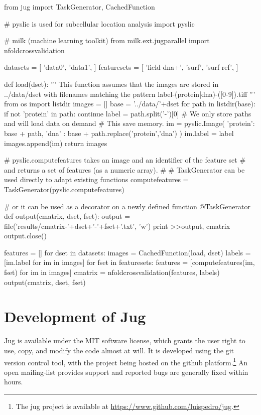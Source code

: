 \documentclass{article}
\begin{document}
\begin{python}
from jug import TaskGenerator, CachedFunction

# pyslic is used for subcellular location analysis
import pyslic

# milk (machine learning toolkit)
from milk.ext.jugparallel import nfoldcrossvalidation

datasets = [ 'data0', 'data1', ]
featuresets = [ 'field-dna+', 'surf', 'surf-ref', ]

def load(dset):
    '''
    This function assumes that the images are stored in ../data/dset with
    filenames matching the pattern
    label-(protein|dna)-([0-9]).tiff
    '''
    from os import listdir
    images = []
    base = '../data/'+dset
    for path in listdir(base):
        if not 'protein' in path: continue
        label = path.split('-')[0]
        # We only store paths and will load data on demand
        # This save memory.
        im = pyslic.Image({
                'protein': base + path,
                'dna' : base + path.replace('protein','dna')
                })
        im.label = label
        images.append(im)
    return images

# pyslic.computefeatures takes an image and an identifier of the feature set
# and returns a set of features (as a numeric array).
#
# TaskGenerator can be used directly to adapt existing functions
computefeatures = TaskGenerator(pyslic.computefeatures)

# or it can be used as a decorator on a newly defined function
@TaskGenerator
def output(cmatrix, dset, fset):
    output = file('results/cmatrix-'+dset+'-'+fset+'.txt', 'w')
    print >>output, cmatrix
    output.close()

features = []
for dset in datasets:
    images = CachedFunction(load, dset)
    labels = [im.label for im in images]
    for fset in featuresets:
        features = [computefeatures(im, fset) for im in images]
        cmatrix = nfoldcrossvalidation(features, labels)
        output(cmatrix, dset, fset)
\end{python}

\section{Development of Jug}
Jug is available under the MIT software license, which grants the user right to
use, copy, and modify the code almost at will. It is developed using the git
version control tool, with the project being hosted on the github
platform.\footnote{The jug project is available at
\url{https://www.github.com/luispedro/jug}.} An open mailing-list provides
support and reported bugs are generally fixed within hours.
\end{document}
